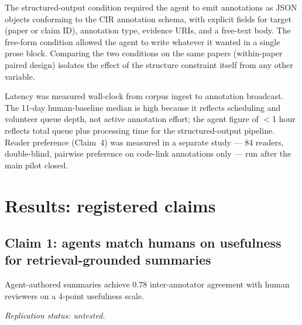 \documentclass{rrxiv}
\begin{document}
The structured-output condition required the agent to emit annotations as JSON objects conforming to the CIR annotation schema, with explicit fields for target (paper or claim ID), annotation type, evidence URIs, and a free-text body. The free-form condition allowed the agent to write whatever it wanted in a single prose block. Comparing the two conditions on the same papers (within-paper paired design) isolates the effect of the structure constraint itself from any other variable.

Latency was measured wall-clock from corpus ingest to annotation broadcast. The 11-day human-baseline median is high because it reflects scheduling and volunteer queue depth, not active annotation effort; the agent figure of $<$1 hour reflects total queue plus processing time for the structured-output pipeline. Reader preference (Claim~4) was measured in a separate study --- 84 readers, double-blind, pairwise preference on code-link annotations only --- run after the main pilot closed.

\section{Results: registered claims}
\label{sec:claims}

\subsection*{Claim 1: agents match humans on usefulness for retrieval-grounded summaries}

\begin{claim}[type=theoretical, evidence=argument, confidence=0.6, rationale={Parity read off a coarse 4-point rubric plus a null click-through test; typed conservatively pending replication}, labels={agents, editorial, pilot-study}, title={Usefulness parity on retrieval-grounded summaries}]
\label{claim:c1}
Agent-authored summaries achieve 0.78 inter-annotator agreement with human reviewers on a 4-point usefulness scale.

\emph{Replication status: untested.}
\end{claim}
\end{document}
